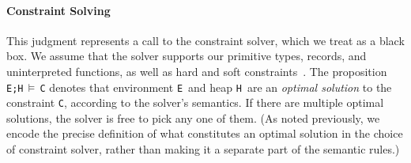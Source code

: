 \documentclass[10pt,reprint]{sigplanconf-preprint}
\newcommand{\stay}[2]{stay({\tt #1})~$=$~{\tt #2}}
\newcommand{\istay}[2]{i-stay({\tt #1})~$=$~{\tt #2}}
\newcommand{\solveH}[3]{{\tt #1;#2}\,$\models$\,{\tt #3}}
\newcommand{\inferax}[2]{\infax[#1]{\mbox{#2}}}
\newcommand{\E}{\texttt{\upshape E}\xspace}
\newcommand{\C}{\texttt{C}}
\renewcommand{\H}{\texttt{\upshape H}\xspace}
\begin{document}
\paragraph{Constraint Solving}
\label{sec:constraint-solving}

This judgment represents a call to the constraint solver, which we
treat as a black box.  We assume that the solver
supports our primitive types, records, and uninterpreted functions,
as well as hard and soft constraints~\cite{borning1992constraint}. The proposition \mbox{\solveH{\E}{\H}{\C}}
denotes that environment \E\ and heap \H\ are an \emph{optimal solution}
to the constraint {\tt C}, according to the solver's semantics.  
If there are multiple optimal solutions, the solver is free to pick any one of
them.  (As 
noted previously, we encode the precise definition of what constitutes
an optimal solution in the choice of constraint solver, rather than
making it a separate part of the semantic rules.)




\end{document}
